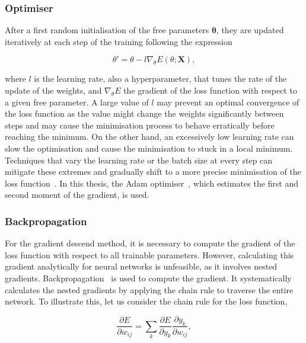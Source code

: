 \subsubsection{Optimiser}

After a first random initialisation of the free parameters $\boldsymbol{\theta}$, they are updated iteratively at each step of the training following the expression

\begin{equation}
    \theta' = \theta - l \nabla_\theta E(\theta;\mathbf{X}),
\end{equation}

where $l$ is the learning rate, also a hyperparameter, that tunes the rate of the update of the weights, and $\nabla_\theta E$ the gradient of the loss function with respect to a given free parameter. A large value of $l$ may prevent an optimal convergence of the loss function as the value might change the weights significantly between steps and may cause the minimisation process to behave erratically before reaching the minimum. On the other hand, an excessively low learning rate can slow the optimisation and cause the minimisation to stuck in a local minimum. Techniques that vary the learning rate or the batch size at every step can mitigate these extremes and gradually shift to a more precise minimisation of the loss function~\cite{LRBatchSize}. In this thesis, the Adam optimiser~\cite{Kingma2015AdamAM}, which estimates the first and second moment of the gradient, is used.

\subsubsection{Backpropagation}

For the gradient descend method, it is necessary to compute the gradient of the loss function with respect to all trainable parameters. However, calculating this gradient analytically for neural networks is unfeasible, as it involves nested gradients. Backpropagation~\cite{Rumelhart1986} is used to compute the gradient. It systematically calculates the nested gradients by applying the chain rule to traverse the entire network. To illustrate this, let us consider the chain rule for the loss function,

\begin{equation}
    \frac{\partial E}{\partial w_{ij}} = \sum_k \frac{\partial E}{\partial y_k} \frac{\partial y_k}{\partial w_{ij}},
\end{equation}

